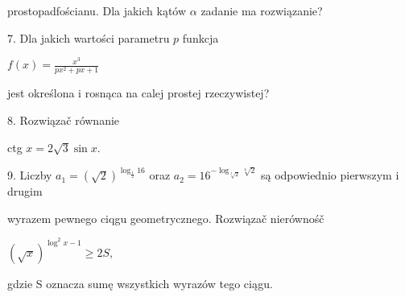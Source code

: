 \documentclass[a4paper,12pt]{article}
\begin{document}
prostopadfościanu. Dla jakich kątów $\alpha$ zadanie ma rozwiązanie?

7. Dla jakich wartości parametru $p$ funkcja

$f(x)=\displaystyle \frac{x^{3}}{px^{2}+px+1}$

jest określona $\mathrm{i}$ rosnąca na calej prostej rzeczywistej?

8. Rozwiązač równanie

ctg $x=2\sqrt{3}\sin x.$

9. Liczby $a_{1} = (\sqrt{2})^{\log_{\frac{1}{2}}16}$ oraz $a_{2} = 16^{-\log_{\sqrt[3]{2}}\sqrt[4]{2}}$ są odpowiednio pierwszym $\mathrm{i}$ drugim

wyrazem pewnego ciqgu geometrycznego. Rozwiązač nierównośč

$(\sqrt{x})^{\log^{2}x-1}\geq 2S,$

gdzie S oznacza sumę wszystkich wyrazów tego ciągu.
\end{document}

